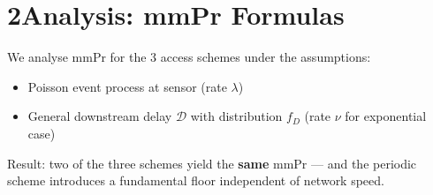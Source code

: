 \documentclass[10pt,a4paper]{article}
\begin{document}
\vspace{2pt}

\section*{2\quad Analysis: mmPr Formulas}

We analyse mmPr for the 3 access schemes under the assumptions:
\begin{itemize}
  \item Poisson event process at sensor (rate $\lambda$)
  \item General downstream delay $\mathcal{D}$ with distribution $f_D$ (rate $\nu$ for exponential case)
\end{itemize}
Result: two of the three schemes yield the \textbf{same} mmPr --- and the periodic scheme introduces a fundamental floor independent of network speed.

\vspace{1pt}
\end{document}

